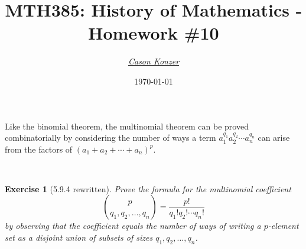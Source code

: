 \documentclass[12pt]{article}
\newcommand{\XB}{\color{black}}
\newcommand{\XBB}{\color{blue}}
\newcommand{\XV}{\color{violet}}
\theoremstyle{plain}
\newtheorem{ex}{Exercise}
\begin{document}
\title{\textbf{MTH385}: History of Mathematics - Homework \#10}
\date{\today}
\author{\XV\textit{\large{\href{https://github.com/casonk}{Cason Konzer}}}\XB}

\maketitle

\hrulefill

\newpage

Like the binomial theorem,
the multinomial theorem can be proved combinatorially by considering the number of ways a term
$ a_{1}^{q_{1}} a_{2}^{q_{2} }\cdots a_{n}^{q_{n}} $
can arise from the factors of $ ( a_{1} + a_{2} + \cdots + a_{n})^{p} $.


\XBB\hrulefill\XB \\
\begin{ex} [5.9.4 rewritten]
  Prove the formula for the multinomial coefficient
  \[
    \binom{p}{q_{1}, q_{2}, \ldots, q_{n}} = \frac{p!}{q_{1}!q_{2}! \cdots q_{n}!}
  \]
  by observing that the coefficient equals the number of ways of writing a
  $ p $-element set as a disjoint union of subsets of sizes $ q_{1}, q_{2}, \ldots, q_{n} $.
\end{ex}
\XBB\hrulefill\XB \\
\end{document}
